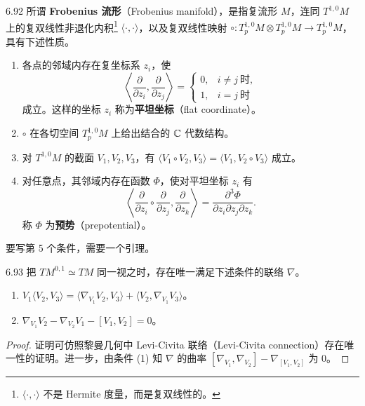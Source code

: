 \begin{definition}{6.92}
  所谓 \textbf{Frobenius 流形}（Frobenius manifold），是指复流形 $M$，连同 $T^{1,0}M$ 上的复双线性非退化内积\footnote{$\langle\cdot,\cdot\rangle$ 不是 Hermite 度量，而是复双线性的。} $\langle\cdot,\cdot\rangle$，以及复双线性映射 $\circ\colon T_p^{1,0}M\otimes T_p^{1,0}M\to T_p^{1,0}M$，具有下述性质。
  \begin{enumerate}[label=（\arabic*）,leftmargin=2.4em]
    \item 各点的邻域内存在复坐标系 $z_i$，使
    \[
      \left\langle\frac{\partial}{\partial z_i},\frac{\partial}{\partial z_j}\right\rangle
      =\begin{cases}0,&i\ne j\ \text{时},\\ 1,&i=j\ \text{时}\end{cases}
    \]
    成立。这样的坐标 $z_i$ 称为\textbf{平坦坐标}（flat coordinate）。
    \item $\circ$ 在各切空间 $T_p^{1,0}M$ 上给出结合的 $\mathbb{C}$ 代数结构。
    \item 对 $T^{1,0}M$ 的截面 $V_1,V_2,V_3$，有 $\langle V_1\circ V_2,V_3\rangle=\langle V_1,V_2\circ V_3\rangle$ 成立。
    \item 对任意点，其邻域内存在函数 $\Phi$，使对平坦坐标 $z_i$ 有
    \[
      \left\langle\frac{\partial}{\partial z_i}\circ\frac{\partial}{\partial z_j},
      \frac{\partial}{\partial z_k}\right\rangle
      =\frac{\partial^3\Phi}{\partial z_i\partial z_j\partial z_k} .
    \]
    称 $\Phi$ 为\textbf{预势}（prepotential）。
  \end{enumerate}
\end{definition}

要写第 5 个条件，需要一个引理。

\begin{lemma*}{6.93}
  把 $TM^{0,1}\simeq TM$ 同一视之时，存在唯一满足下述条件的联络 $\nabla$。
  \begin{enumerate}[label=（\arabic*）,leftmargin=2.4em]
    \item $V_1\langle V_2,V_3\rangle=\langle\nabla_{V_1}V_2,V_3\rangle+\langle V_2,\nabla_{V_1}V_3\rangle$。
    \item $\nabla_{V_1}V_2-\nabla_{V_2}V_1-[V_1,V_2]=0$。
  \end{enumerate}
\end{lemma*}

\begin{proof}
  证明可仿照黎曼几何中 Levi-Civita 联络（Levi-Civita connection）存在唯一性的证明。进一步，由条件 (1) 知 $\nabla$ 的曲率 $[\nabla_{V_1},\nabla_{V_2}]-\nabla_{[V_1,V_2]}$ 为 $0$。
\end{proof}

